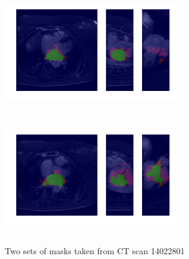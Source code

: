 \begin{figure}[H]
\centering
\label{final_model}
\begin{minipage}{0.45\textwidth}
\centering
{\includegraphics[trim=0cm 2cm 0cm 2cm, clip=true, height=50mm, width=75mm]{Appendix/img/Masks_for_14022801_0.png}}
\end{minipage}\hfill
\begin{minipage}{0.45\textwidth}
\centering
{\includegraphics[trim=0cm 2cm 0cm 2cm, clip=true, height=50mm, width=75mm]{Appendix/img/Masks_for_14022801_1.png}}
\end{minipage}
\caption{Two sets of masks taken from CT scan 14022801}
\end{figure}

